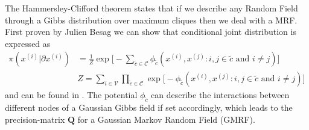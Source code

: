 The Hammersley-Clifford theorem states that if we describe any Random Field through a Gibbs distribution over maximum cliques then we deal with a MRF.
First proven by Julien Besag we can show that conditional joint distribution is expressed as
\begin{align}
\pi(x^{(i)} | \partial x^{(i)}) &= \frac{1}{Z} \exp{\big[  -\sum_{\tilde{c} \in \mathcal{C}} \phi_{\tilde{c}}(x^{(i)},x^{(j)} : i,j \in \tilde{c} \text{ and } i \neq j) \big]}\\
     &Z = \sum_{i \in \mathcal{V}} \prod_{\tilde{c} \in \mathcal{C}} \exp{ \Big[ - \phi_{\tilde{c}} (x^{(i)},x^{(j)}: i,j \in \tilde{c} \text{ and } i \neq j) \Big] }
\end{align}
and can be found in \cite{besag1974spatial}.
The potential $\phi_{\tilde{c}}$ can describe the interactions between different nodes of a Gaussian Gibbs field if set accordingly, which leads to the precision-matrix $\bm{Q}$ for a Gaussian Markov Random Field (GMRF).





